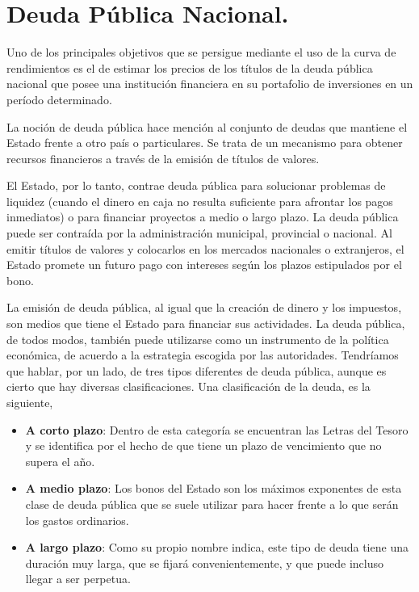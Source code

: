 \section{Deuda P\'ublica Nacional.}

\hspace*{0.4 cm} Uno de los principales objetivos que se persigue mediante el uso de la curva de rendimientos es el de estimar los precios de los t\'itulos de la deuda p\'ublica nacional que posee una instituci\'on financiera en su portafolio de inversiones en un per\'iodo determinado. 



\hspace*{0.4 cm} La noci\'on de deuda p\'ublica hace menci\'on al conjunto de deudas que mantiene el Estado frente a otro pa\'is o particulares. Se trata de un mecanismo para obtener recursos financieros a trav\'es de la emisi\'on de t\'itulos de valores.

\hspace*{0.4 cm} El Estado, por lo tanto, contrae deuda p\'ublica para solucionar problemas de liquidez (cuando el dinero en caja no resulta suficiente para afrontar los pagos inmediatos) o para financiar proyectos a medio o largo plazo. La deuda p\'ublica puede ser contra\'ida por la administraci\'on municipal, provincial o nacional. Al emitir t\'itulos de valores y colocarlos en los mercados nacionales o extranjeros, el Estado promete un futuro pago con intereses seg\'un los plazos estipulados por el bono.

\hspace*{0.4 cm} La emisi\'on de deuda p\'ublica, al igual que la creaci\'on de dinero y los impuestos, son medios que tiene el Estado para financiar sus actividades. La deuda p\'ublica, de todos modos, tambi\'en puede utilizarse como un instrumento de la pol\'itica econ\'omica, de acuerdo a la estrategia escogida por las autoridades. Tendr\'iamos que hablar, por un lado, de tres tipos diferentes de deuda p\'ublica, aunque es cierto que hay diversas clasificaciones. Una clasificaci\'on de la deuda, es la siguiente,

\begin{itemize}
  \item \textbf{A corto plazo}: Dentro de esta categor\'ia se encuentran las Letras del Tesoro y se identifica por el hecho de que tiene un plazo de vencimiento que no supera el a\~no.
  \item \textbf{A medio plazo}: Los bonos del Estado son los m\'aximos exponentes de esta clase de deuda p\'ublica que se suele utilizar para hacer frente a lo que ser\'an los gastos ordinarios.
  \item \textbf{A largo plazo}: Como su propio nombre indica, este tipo de deuda tiene una duraci\'on muy larga, que se fijar\'a convenientemente, y que puede incluso llegar a ser perpetua. 
\end{itemize}


